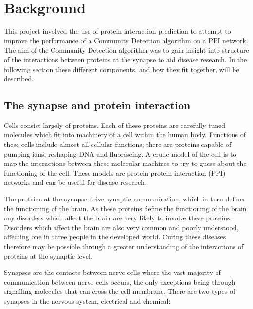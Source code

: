 \chapter{Background}
\label{background}

This project involved the use of protein interaction prediction to attempt to improve the performance of a Community Detection algorithm on a PPI network.
The aim of the Community Detection algorithm was to gain insight into structure of the interactions between proteins at the synapse to aid disease research.
In the following section these different components, and how they fit together, will be described.

\section{The synapse and protein interaction}

Cells consist largely of proteins.
Each of these proteins are carefully tuned molecules which fit into machinery of a cell within the human body.
Functions of these cells include almost all cellular functions; there are proteins capable of pumping ions, reshaping DNA and fluorescing\autocite{alberts_molecular_2008}.
A crude model of the cell is to map the interactions between these molecular machines to try to guess about the functioning of the cell.
These models are protein-protein interaction (PPI) networks and can be useful for disease research.

The proteins at the synapse drive synaptic communication, which in turn defines the functioning of the brain.
As these proteins define the functioning of the brain any disorders which affect the brain are very likely to involve these proteins.
Disorders which affect the brain are also very common and poorly understood, affecting one in three people in the developed world\autocite{citation_needed}.
Curing these diseases therefore may be possible through a greater understanding of the interactions of proteins at the synaptic level\autocites{synsys,chua_architecture_2010}.

Synapses are the contacts between nerve cells where the vast majority of communication between nerve cells occurs, the only exceptions being through signalling molecules that can cross the cell membrane.
There are two types of synapses in the nervous system, electrical and chemical\autocite{kandel_principles_2000}:

